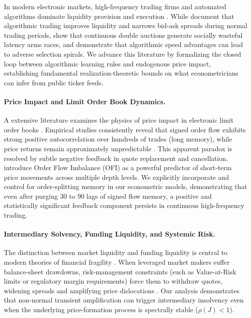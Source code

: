 \documentclass[12pt]{article}
\theoremstyle{definition}
\theoremstyle{remark}
\begin{document}
In modern electronic markets, high-frequency trading firms and automated algorithms dominate liquidity provision and execution \citep{menkveld2013,budish2015,biais2015}. While \citet{hendershott2011does} document that algorithmic trading improves liquidity and narrows bid-ask spreads during normal trading periods, \citet{budish2015} show that continuous double auctions generate socially wasteful latency arms races, and \citet{biais2015} demonstrate that algorithmic speed advantages can lead to adverse selection spirals. We advance this literature by formalizing the closed loop between algorithmic learning rules and endogenous price impact, establishing fundamental realization-theoretic bounds on what econometricians can infer from public ticker feeds.

\paragraph{Price Impact and Limit Order Book Dynamics.}
A extensive literature examines the physics of price impact in electronic limit order books \citep{almgren2000,bouchaud2004fluctuations,cont2010stochastic,cont2014}. Empirical studies consistently reveal that signed order flow exhibits strong positive autocorrelation over hundreds of trades (long memory), while price returns remain approximately unpredictable \citep{bouchaud2004fluctuations,cont2014}. This apparent paradox is resolved by subtle negative feedback in quote replacement and cancellation. \citet{cont2014} introduce Order Flow Imbalance (OFI) as a powerful predictor of short-term price movements across multiple depth levels. We explicitly incorporate and control for order-splitting memory in our econometric models, demonstrating that even after purging 30 to 90 lags of signed flow memory, a positive and statistically significant feedback component persists in continuous high-frequency trading.

\paragraph{Intermediary Solvency, Funding Liquidity, and Systemic Risk.}
The distinction between market liquidity and funding liquidity is central to modern theories of financial fragility \citep{brunnermeier2009,adrian2010liquidity,he2013intermediary}. When leveraged market makers suffer balance-sheet drawdowns, risk-management constraints (such as Value-at-Risk limits or regulatory margin requirements) force them to withdraw quotes, widening spreads and amplifying price dislocations \citep{greenwood2015vulnerable,eisenberg2001systemic}. Our analysis demonstrates that non-normal transient amplification can trigger intermediary insolvency even when the underlying price-formation process is spectrally stable ($\rho(J) < 1$).
\end{document}
